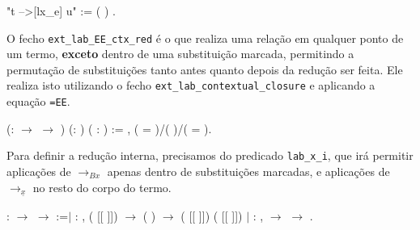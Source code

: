 \bigskip
\coqdocnoindent {} "t -->[lx\_e] u" :=
(   ) .
\coqdoceol
\bigskip

O fecho \texttt{ext\_lab\_EE\_ctx\_red} é o que realiza uma relação em qualquer
ponto de um termo, \textbf{exceto} dentro de uma substituição marcada, permitindo
a permutação de substituições tanto antes quanto depois da redução ser feita.
Ele realiza isto utilizando o fecho \texttt{ext\_lab\_contextual\_closure}
e aplicando a equação \texttt{=EE}.

\bigskip

\coqdocnoindent
{}  (:
 \ensuremath{\rightarrow} 
\ensuremath{\rightarrow} ) (: )
( : ) := 
\coqdocindent{4.00em}
\coqdoctac{\ensuremath{\exists}}  , (
=
)/(
  )/(
= ).\coqdoceol \coqdocemptyline \coqdocnoindent

\bigskip


Para definir a redução interna, precisamos do predicado
\texttt{lab\_x\_i}, que irá permitir aplicações de $\rightarrow_{Bx}$ apenas
dentro de substituições marcadas, e aplicações de $\rightarrow_{\underline{x}}$
no resto do corpo do termo.

\bigskip

\coqdocnoindent{} : 
\ensuremath{\rightarrow}  \ensuremath{\rightarrow}
 :=\coqdoceol \coqdocnoindent \ensuremath{|}
: \coqdockw{\ensuremath{\forall}}
  , \coqdoceol \coqdocindent{11.50em}
 ( [[  ]])
\ensuremath{\rightarrow}\coqdoceol \coqdocindent{11.50em} (
 ) \ensuremath{\rightarrow}\coqdoceol
\coqdocindent{11.50em}  ( [[ 
]]) ( [[  ]])\coqdoceol \coqdocnoindent
\ensuremath{|}  : \coqdockw{\ensuremath{\forall}}
 , \coqdoceol \coqdocindent{8.00em}
  \ensuremath{\rightarrow}\coqdoceol
\coqdocindent{8.00em}   
\ensuremath{\rightarrow} \coqdoceol \coqdocindent{8.00em} 
 .\coqdoceol 

